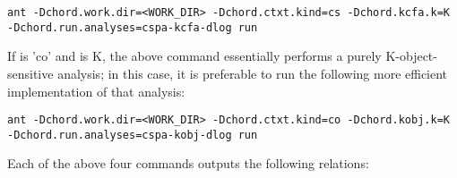 \begin{framed}
\begin{verbatim}
ant -Dchord.work.dir=<WORK_DIR> -Dchord.ctxt.kind=cs -Dchord.kcfa.k=K -Dchord.run.analyses=cspa-kcfa-dlog run
\end{verbatim}
\end{framed}

If  is 'co' and  is K,
the above command essentially performs a purely K-object-sensitive analysis; in
this case, it is preferable to run the following more efficient implementation
of that analysis:

\begin{framed}
\begin{verbatim}
ant -Dchord.work.dir=<WORK_DIR> -Dchord.ctxt.kind=co -Dchord.kobj.k=K -Dchord.run.analyses=cspa-kobj-dlog run
\end{verbatim}
\end{framed}

Each of the above four commands outputs the following relations:


